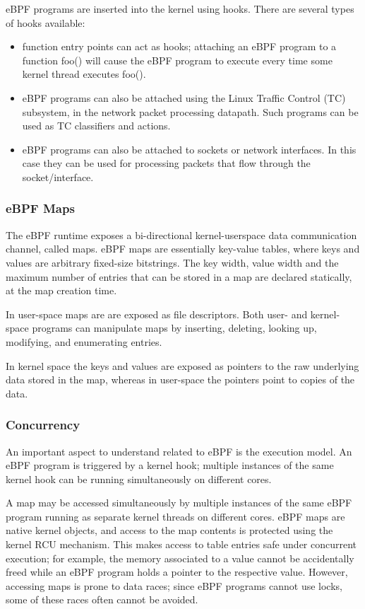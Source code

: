 eBPF programs are inserted into the kernel using hooks. There are
several types of hooks available:

\begin{itemize}
\item function entry points can act as hooks; attaching an eBPF
  program to a function foo() will cause the eBPF program to execute
  every time some kernel thread executes foo().

\item eBPF programs can also be attached using the Linux Traffic
  Control (TC) subsystem, in the network packet processing
  datapath. Such programs can be used as TC classifiers and actions.

\item eBPF programs can also be attached to sockets or network
  interfaces. In this case they can be used for processing packets
  that flow through the socket/interface.
\end{itemize}

\subsubsection{eBPF Maps}

The eBPF runtime exposes a bi-directional kernel-userspace data
communication channel, called maps.  eBPF maps are essentially
key-value tables, where keys and values are arbitrary fixed-size
bitstrings. The key width, value width and the maximum number of
entries that can be stored in a map are declared statically, at the
map creation time.

In user-space maps are are exposed as file descriptors. Both user- and
kernel-space programs can manipulate maps by inserting, deleting,
looking up, modifying, and enumerating entries.

In kernel space the keys and values are exposed as pointers to the raw
underlying data stored in the map, whereas in user-space the
pointers point to copies of the data.

\subsubsection{Concurrency}

An important aspect to understand related to eBPF is the execution
model. An eBPF program is triggered by a kernel hook; multiple
instances of the same kernel hook can be running simultaneously on
different cores.

A map may be accessed simultaneously by multiple instances of the same
eBPF program running as separate kernel threads on different cores.
eBPF maps are native kernel objects, and access to the map contents is
protected using the kernel RCU mechanism. This makes access to table
entries safe under concurrent execution; for example, the memory
associated to a value cannot be accidentally freed while an eBPF
program holds a pointer to the respective value.  However, accessing
maps is prone to data races; since eBPF programs cannot use locks,
some of these races often cannot be avoided.

